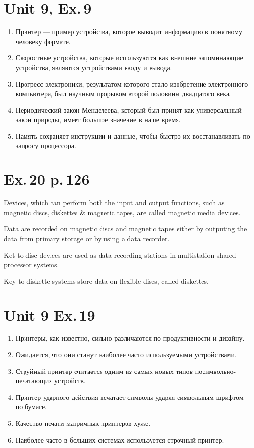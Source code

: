\documentclass[a4paper,10pt,notitlepage,pdftex,headsepline]{scrartcl}
\begin{document}
\section{Unit 9, Ex.\,9}
\begin{enumerate}
\item Принтер --- пример устройства, которое выводит информацию в понятному человеку формате.
\item Скоростные устройства, которые используются как внешние запоминающие устройства, являются устройствами вводу и вывода.
\item Прогресс электроники, результатом которого стало изобретение электронного компьютера, был научным прорывом второй половины двадцатого века.
\item Периодический закон Менделеева, который был принят как универсальный закон природы, имеет большое значение в наше время.
\item Память сохраняет инструкции и данные, чтобы быстро их восстанавливать по запросу процессора.
\end{enumerate}
\section{Ex.\,20 p.\,126}
Devices, which can perform both the input and output functions, such as magnetic discs, diskettes \& magnetic tapes, are called magnetic media devices.

Data are recorded on magnetic discs and magnetic tapes either by outputing the data from primary storage or by using a data recorder.

Ket-to-disc devices are used as data recording stations in multistation shared-processor systems.

Key-to-diskette systems store data on flexible discs, called diskettes.
\section{Unit 9 Ex.\,19}
\begin{enumerate}
\item Принтеры, как известно, сильно различаются по продуктивности и дизайну.
\item Ожидается, что они станут наиболее часто используемыми устройствами.
\item Струйный принтер считается одним из самых новых типов посимвольно-печатающих устройств.
\item Принтер ударного действия печатает символы ударяя символьным шрифтом по бумаге.
\item Качество печати матричных принтеров хуже.
\item Наиболее часто в больших системах используется строчный принтер.
\end{enumerate}
\end{document}
